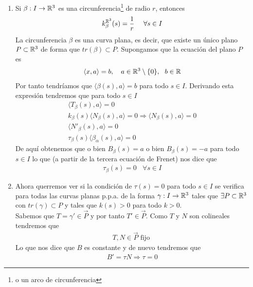 \begin{ejercicio}
\begin{enumerate}
        \item Si $\beta : I \to \mathbb{R}^3$ es una circunferencia\footnote{o un arco de circunferencia} de radio $r$, entonces 
        \begin{gather*}
            k_\beta^{\mathbb{R}^3}(s) = \frac{1}{r} \ \ \ \ \forall s \in I
        \end{gather*}
        La circunferencia $\beta$ es una curva plana, es decir, que existe un único plano $P\subset \mathbb{R}^3$ de forma que $tr(\beta)\subset P$. Supongamos que la ecuación del plano $P$ es 
        \begin{gather*}
            \langle x, a \rangle = b ,\ \ \ a\in \mathbb{R
            }^3\setminus\{0\},\ \ b\in \mathbb{R}
        \end{gather*}
        Por tanto tendríamos que $\langle \beta(s), a \rangle = b$ para todo $s\in I$. Derivando esta expresión tendremos que para todo $s\in I$
        \begin{gather*}
            \langle T_\beta(s), a\rangle = 0\\
            k_\beta(s)\langle N_\beta(s), a \rangle = 0 \Rightarrow \langle N_\beta(s), a \rangle = 0\\
            \langle N'_\beta(s), a \rangle = 0\\
            \tau_\beta(s) \langle \beta_\alpha(s),a \rangle = 0
        \end{gather*}
        De aquí obtenemos que o bien $B_\beta(s) = a$ o bien $B_\beta(s) = -a$ para todo $s\in I$ lo que (a partir de la tercera ecuación de Frenet) nos dice que 
        \begin{gather*}
            \tau_\beta(s) = 0 \ \ \ \ \forall s \in I
        \end{gather*}

        \item Ahora querremos ver si la condición de $\tau(s)=0$ para todo $s\in I$ se verifica para todas las curvas planas p.p.a. de la forma $\gamma:I \to \mathbb{R}^3$ tales que $\exists P \subset \mathbb{R}^3$ con $tr(\gamma)\subset P$ y tales que $k(s)>0$ para todo $k>0$. \\
         
        Sabemos que $T = \gamma'\in \vec{P}$ y por tanto $T'\in \vec{P}$. Como $T$ y $N$ son colineales tendremos que 
        \begin{gather*}
            T,N\in \vec{P} \text{ fijo }
        \end{gather*}
        Lo que nos dice que $B$ es constante y de nuevo tendremos que 
        \begin{gather*}
            B' = \tau N \Rightarrow \tau = 0
        \end{gather*}


\end{enumerate}
\end{ejercicio}
